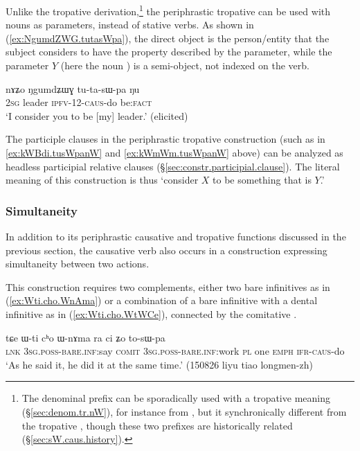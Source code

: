 Unlike the  tropative derivation,\footnote{The  denominal prefix can be sporadically used with a tropative meaning (§\ref{sec:denom.tr.nW}), for instance   from , but it synchronically different from the tropative , though these two prefixes are historically related (§\ref{sec:sW.caus.history}). } the  periphrastic tropative can be used with nouns as parameters, instead of stative verbs. As shown in (\ref{ex:NgumdZWG.tutasWpa}), the direct object is the person/entity that the subject considers to have the property described by the parameter, while the parameter $Y$ (here the noun ) is a semi-object, not indexed on the verb.

\begin{exe}
\ex \label{ex:NgumdZWG.tutasWpa}
\gll nɤʑo ŋgumdʑɯɣ tu-ta-sɯ-pa ŋu \\
\textsc{2sg} leader \textsc{ipfv}-1\fl{}2-\textsc{caus}-do be:\textsc{fact} \\
\glt `I consider you to be [my] leader.' (elicited)
\end{exe}

The participle clauses in the periphrastic tropative construction (such as in \ref{ex:kWBdi.tusWpanW} and \ref{ex:kWmWm.tusWpanW} above) can be analyzed as headless participial relative clauses (§\ref{sec:constr.participial.clause}). The literal meaning of this construction is thus `consider $X$ to be something that is $Y$.' 


\subsubsection{Simultaneity} \label{sec:bare.dental.inf.sWpa}

In addition to its periphrastic causative and tropative functions discussed in the previous section, the causative verb  also occurs in a construction expressing simultaneity between two actions. 

This construction requires two complements, either two bare infinitives as in (\ref{ex:Wti.cho.WnAma}) or a combination of a bare infinitive with a dental infinitive as in (\ref{ex:Wti.cho.WtWCe}), connected by the comitative .


\begin{exe} 
\ex \label{ex:Wti.cho.WnAma}
\gll tɕe ɯ-ti cʰo ɯ-nɤma ra ci ʑo to-sɯ-pa \\
\textsc{lnk} \textsc{3sg}.\textsc{poss}-\textsc{bare}.\textsc{inf}:say \textsc{comit} \textsc{3sg}.\textsc{poss}-\textsc{bare}.\textsc{inf}:work \textsc{pl} one \textsc{emph} \textsc{ifr}-\textsc{caus}-do \\
\glt `As he said it, he did it at the same time.' (150826 liyu tiao longmen-zh)
\end{exe} 

